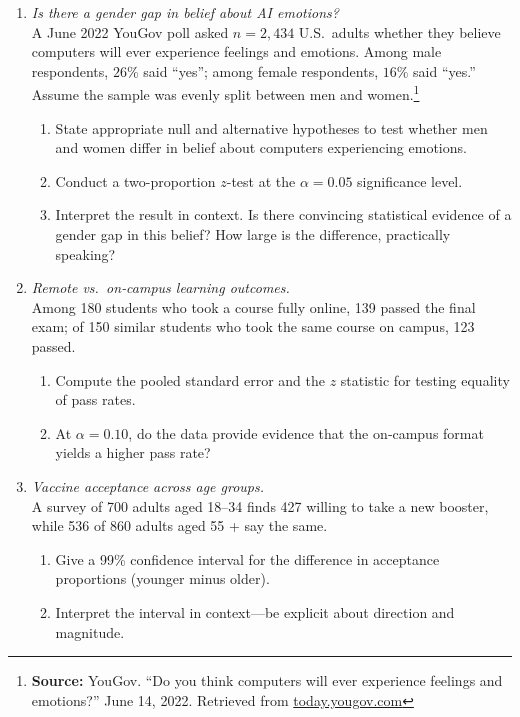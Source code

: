 \documentclass{article}
\begin{document}
\begin{enumerate}
\item \emph{Is there a gender gap in belief about AI emotions?} \\
      A June 2022 YouGov poll asked $n = 2{,}434$ U.S.\ adults whether they believe computers will ever experience feelings and emotions. Among male respondents, $26\%$ said “yes”; among female respondents, $16\%$ said “yes.” Assume the sample was evenly split between men and women.\footnote{\textbf{Source:} YouGov. “Do you think computers will ever experience feelings and emotions?” June 14, 2022. Retrieved from \href{https://today.yougov.com/}{today.yougov.com}}

      \begin{enumerate}[label=(\alph*)]
         \item State appropriate null and alternative hypotheses to test whether men and women differ in belief about computers experiencing emotions.
         \item Conduct a two-proportion $z$-test at the $\alpha = 0.05$ significance level.
         \item Interpret the result in context. Is there convincing statistical evidence of a gender gap in this belief? How large is the difference, practically speaking?
      \end{enumerate}

\item  \emph{Remote vs.\ on‑campus learning outcomes.} \\
      Among 180 students who took a course fully online, 139 passed the final exam;
      of 150 similar students who took the same course on campus, 123 passed.
      \begin{enumerate}[label=(\alph*)]
          \item Compute the pooled standard error and the $z$ statistic for testing equality of pass rates.
          \item At $\alpha=0.10$, do the data provide evidence that the on‑campus format yields a higher pass rate?
      \end{enumerate}

\item  \emph{Vaccine acceptance across age groups.} \\
      A survey of 700 adults aged 18–34 finds 427 willing to take a new booster, while
      536 of 860 adults aged 55 + say the same.
      \begin{enumerate}[label=(\alph*)]
          \item Give a 99\% confidence interval for the difference in acceptance proportions (younger minus older).
          \item Interpret the interval in context—be explicit about direction and magnitude.
      \end{enumerate}


\end{enumerate}
\end{document}
